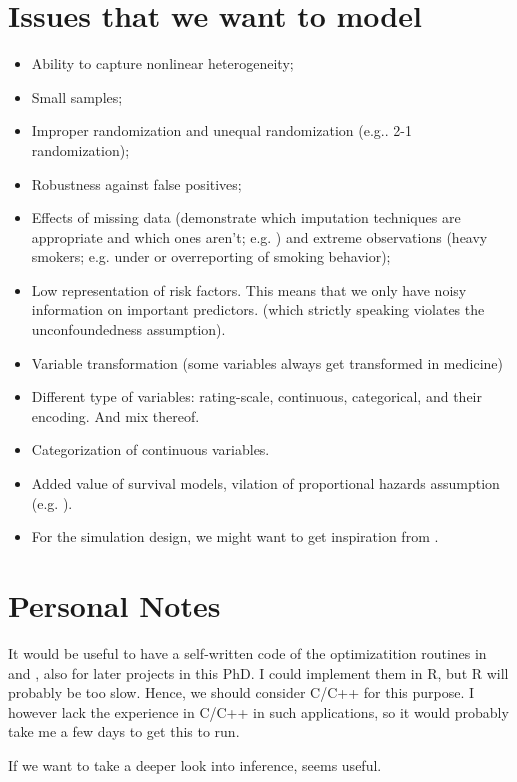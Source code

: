\documentclass[11pt]{article}
\begin{document}
\section{Issues that we want to model}
\begin{itemize}
	\item Ability to capture nonlinear heterogeneity;
	\item Small samples;
	\item Improper randomization and unequal randomization (e.g.. 2-1 randomization);
	\item Robustness against false positives;
	\item Effects of missing data (demonstrate which imputation techniques are appropriate and which ones aren’t; e.g. \citealp{valdiviezo2015tree}) and extreme observations (heavy smokers; e.g. under or overreporting of smoking behavior);
	\item Low representation of risk factors. This means that we only have noisy information on important predictors. (which strictly speaking violates the unconfoundedness assumption).
	\item Variable transformation (some variables always get transformed in medicine)
	\item Different type of variables: rating-scale, continuous, categorical, and their encoding. And mix thereof.
	\item Categorization of continuous variables.
	\item Added value of survival models, vilation of proportional hazards assumption (e.g. \citealp{stensrud2020test}).
	\item For the simulation design, we might want to get inspiration from \cite{knaus2021machine}.
\end{itemize}


\section{Personal Notes}
It would be useful to have a self-written code of the optimizatition routines in \cite{friedman2010} and \cite{simon2011}, also for later projects in this PhD. I could implement them in \textsf{R}, but \textsf{R} will probably be too slow. Hence, we should consider C/C++ for this purpose. I however lack the experience in C/C++ in such applications, so it would probably take me a few days to get this to run.

If we want to take a deeper look into inference, \cite{guo2021} seems useful.







\end{document}
